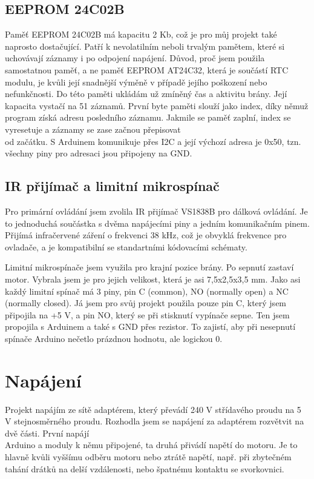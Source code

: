 \documentclass[12pt, a4paper,
twoside,        %
openright
]{report}
\begin{document}
	
	\subsection{EEPROM 24C02B}
	Paměť EEPROM 24C02B má kapacitu 2 Kb, což je pro můj projekt také naprosto dostačující. Patří k nevolatilním neboli trvalým pamětem, které si uchovávají záznamy i po odpojení napájení.   
	Důvod, proč jsem použila samostatnou paměť, a ne paměť EEPROM AT24C32, která je součástí RTC modulu, je kvůli její snadnější výměně v případě jejího poškození nebo nefunkčnosti. 
	Do této paměti ukládám už zmíněný čas a aktivitu brány. Její kapacita vystačí na 51 záznamů. První byte paměti slouží jako index, díky němuž program získá adresu posledního záznamu. Jakmile se paměť zaplní, index se vyresetuje a záznamy se zase začnou přepisovat\\ od začátku. S Arduinem komunikuje přes I2C a její výchozí adresa je 0x50, tzn. všechny piny pro adresaci jsou připojeny na GND. 
	
	
	\subsection{IR přijímač a limitní mikrospínač}
	Pro primární ovládání jsem zvolila IR přijímač VS1838B pro dálková ovládání. Je to jednoduchá součástka s dvěma napájecími piny a jedním komunikačním pinem. Přijímá infračervené záření o frekvenci 38 kHz, což je obvyklá frekvence pro ovladače, a je kompatibilní se standartními kódovacími schématy. 
	
	Limitní mikrospínače jsem využila pro krajní pozice brány. Po sepnutí zastaví motor. Vybrala jsem je pro jejich velikost, která je asi 7,5x2,5x3,5 mm. Jako asi každý limitní spínač má 3 piny, pin C (common), NO (normally open) a NC (normally closed). Já jsem pro svůj projekt použila pouze pin C, který jsem připojila na +5 V, a pin NO, který se při stisknutí vypínače sepne. Ten jsem propojila s Arduinem a také s GND přes rezistor. To zajistí, aby při nesepnutí spínače Arduino nečetlo prázdnou hodnotu, ale logickou 0. 
	\pagebreak
	
	\section[Napájení]{Napájení}
	Projekt napájím ze sítě adaptérem, který převádí 240 V střídavého proudu na 5 V stejnosměrného proudu. Rozhodla jsem se napájení za adaptérem rozvětvit na dvě části. První napájí\\ Arduino a moduly k němu připojené, ta druhá přivádí napětí do motoru. Je to hlavně kvůli vyššímu odběru motoru nebo ztrátě napětí, např. při zbytečném tahání drátků na delší vzdálenosti, nebo špatnému kontaktu se svorkovnici.
	
\end{document}
